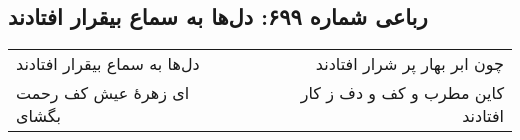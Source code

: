 \begin{center}
\section*{رباعی شماره ۶۹۹: دل‌ها به سماع بیقرار افتادند}
\label{sec:0699}
\begin{longtable}{l p{0.5cm} r}
دل‌ها به سماع بیقرار افتادند
&&
چون ابر بهار پر شرار افتادند
\\
ای زهرهٔ عیش کف رحمت بگشای
&&
کاین مطرب و کف و دف ز کار افتادند
\\
\end{longtable}
\end{center}

